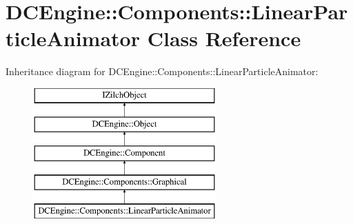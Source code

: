 \hypertarget{classDCEngine_1_1Components_1_1LinearParticleAnimator}{\section{D\-C\-Engine\-:\-:Components\-:\-:Linear\-Particle\-Animator Class Reference}
\label{classDCEngine_1_1Components_1_1LinearParticleAnimator}
}
Inheritance diagram for D\-C\-Engine\-:\-:Components\-:\-:Linear\-Particle\-Animator\-:\begin{figure}[H]
\begin{center}
\leavevmode
\includegraphics[height=5.000000cm]{classDCEngine_1_1Components_1_1LinearParticleAnimator}
\end{center}
\end{figure}
